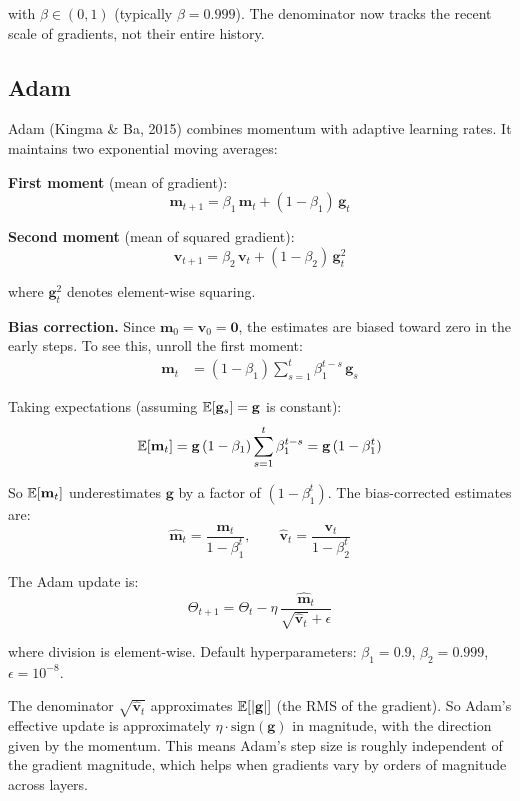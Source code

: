 \documentclass[main.tex]{subfiles}
\begin{document}
with $\beta \in (0,1)$ (typically $\beta = 0.999$). The denominator now tracks the recent scale of gradients, not their entire history.

\subsection{Adam}

Adam (Kingma \& Ba, 2015) combines momentum with adaptive learning rates. It maintains two exponential moving averages:

\textbf{First moment} (mean of gradient):
$$\mathbf{m}_{t+1} = \beta_1\,\mathbf{m}_t + (1 - \beta_1)\,\mathbf{g}_t$$

\textbf{Second moment} (mean of squared gradient):
$$\mathbf{v}_{t+1} = \beta_2\,\mathbf{v}_t + (1 - \beta_2)\,\mathbf{g}_t^2$$

where $\mathbf{g}_t^2$ denotes element-wise squaring.

\textbf{Bias correction.} Since $\mathbf{m}_0 = \mathbf{v}_0 = \mathbf{0}$, the estimates are biased toward zero in the early steps. To see this, unroll the first moment:
\begin{align}
\mathbf{m}_t &= (1 - \beta_1)\sum_{s=1}^{t}\beta_1^{t-s}\,\mathbf{g}_s
\end{align}

Taking expectations (assuming $\mathbb{E}[\mathbf{g}_s] = \mathbf{g}$ is constant):
$$\mathbb{E}[\mathbf{m}_t] = \mathbf{g}\,(1-\beta_1)\sum_{s=1}^{t}\beta_1^{t-s} = \mathbf{g}\,(1 - \beta_1^t)$$

So $\mathbb{E}[\mathbf{m}_t]$ underestimates $\mathbf{g}$ by a factor of $(1 - \beta_1^t)$. The bias-corrected estimates are:
$$\hat{\mathbf{m}}_t = \frac{\mathbf{m}_t}{1 - \beta_1^t}, \qquad \hat{\mathbf{v}}_t = \frac{\mathbf{v}_t}{1 - \beta_2^t}$$

The Adam update is:
$$\boxed{\Theta_{t+1} = \Theta_t - \eta\,\frac{\hat{\mathbf{m}}_t}{\sqrt{\hat{\mathbf{v}}_t} + \epsilon}}$$

where division is element-wise. Default hyperparameters: $\beta_1 = 0.9$, $\beta_2 = 0.999$, $\epsilon = 10^{-8}$.

\begin{remark}
The denominator $\sqrt{\hat{\mathbf{v}}_t}$ approximates $\mathbb{E}[|\mathbf{g}|]$ (the RMS of the gradient). So Adam's effective update is approximately $\eta \cdot \text{sign}(\mathbf{g})$ in magnitude, with the direction given by the momentum. This means Adam's step size is roughly independent of the gradient magnitude, which helps when gradients vary by orders of magnitude across layers.
\end{remark}
\end{document}

